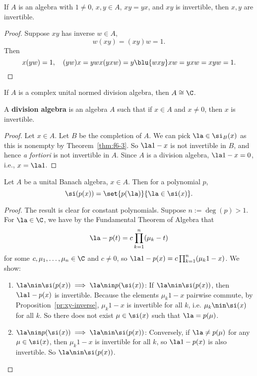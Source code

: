 \begin{pr}
If $A$ is an algebra with $1\ne 0$, $x,y\in A$, $xy=yx$, and $xy$ is invertible, then $x,y$ are invertible.
\end{pr}
\begin{proof}
Suppose $xy$ has inverse $w\in A$,
\[
w(xy)=(xy)w=1.
\]
Then
\[
x(yw)=1,\quad (yw)x=ywx(yxw)=y\blu{wxy}xw=yxw=xyw=1.
\]
\end{proof}
\begin{cor}
If $A$ is a complex unital normed division algebra, then $A\cong \C$.
\end{cor}
\begin{df}
A \textbf{division algebra} is an algebra $A$ such that if $x\in A$ and $x\ne 0$, then $x$ is invertible.
\end{df}
\begin{proof}
Let $x\in A$. Let $B$ be the completion of $A$. We can pick $\la\in \si_B(x)$ as this is nonempty by Theorem~\ref{thm:f6-3}. So $\la 1-x$ is not invertible in $B$, and hence {\it a fortiori} is not invertible in $A$. Since $A$ is a division algebra, $\la 1-x=0$, i.e., $x=\la 1$.
\end{proof}
\begin{thm}
Let $A$ be a unital Banach algebra, $x\in A$. Then for a polynomial $p$, 
\[
\si(p(x))=\set{p(\la)}{\la \in \si(x)}.
\]
\end{thm}
\begin{proof}
The result is clear for constant polynomials. Suppose $n:=\deg(p)>1$. For $\la\in \C$, we have by the Fundamental Theorem of Algebra that 
\[
\la-p(t)=c\prod_{k=1}^n (\mu_k-t)
\]
for some $c,\mu_1,\ldots, \mu_n\in \C$ and $c\ne 0$, so $\la1-p(x)=c\prod_{k=1}^n (\mu_k1-x)$. 
We show:
\begin{enumerate}
\item $\la\nin \si(p(x))\implies \la\nin p(\si(x))$:
If $\la\nin \si(p(x))$, then $\la 1-p(x)$ is invertible. Because the elements $\mu_k1-x$ pairwise commute, by Proposition~\ref{pr:xy-inverse}, $\mu_k1-x$ is invertible for all $k$, i.e. $\mu_k\nin \si(x)$ for all $k$. So there does not exist $\mu\in \si(x)$ such that $\la=p(\mu)$. 
\item $\la\nin p(\si(x))\implies \la\nin \si(p(x))$:
Conversely, if $\la\ne p(\mu)$ for any $\mu\in \si(x)$, then $\mu_k1-x$ is invertible for all $k$, so $\la1-p(x)$ is also invertible. So $\la\nin \si(p(x))$.
\end{enumerate}
\end{proof}
